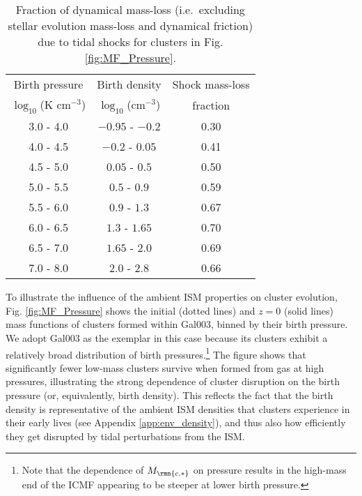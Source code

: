 \documentclass[fleqn,usenatbib]{mnras}
\newcommand{\Mcstar}{M_\rmn{c,\ast}}
\begin{document}
\begin{table}
\caption{Fraction of dynamical mass-loss (i.e.~excluding stellar evolution mass-loss and dynamical friction) due to tidal shocks for clusters in Fig. \ref{fig:MF_Pressure}.}
\label{tab:P-disruption}
\centering
\begin{tabular} {@{}ccc@{}}
  \hline
  Birth pressure           & Birth density & Shock mass-loss \\
  $\log_{10}$(K cm$^{-3}$) & $\log_{10}$(cm$^{-3}$) & fraction \\
  \hline
  3.0 - 4.0  &  $-0.95$ - $-0.2 $  &  0.30 \\
  4.0 - 4.5  &  $-0.2 $ - $ 0.05$  &  0.41 \\
  4.5 - 5.0  &  $ 0.05$ - $ 0.5 $  &  0.50 \\
  5.0 - 5.5  &  $ 0.5 $ - $ 0.9 $  &  0.59 \\
  5.5 - 6.0  &  $ 0.9 $ - $ 1.3 $  &  0.67 \\
  6.0 - 6.5  &  $ 1.3 $ - $ 1.65$  &  0.70 \\
  6.5 - 7.0  &  $ 1.65$ - $ 2.0 $  &  0.69 \\
  7.0 - 8.0  &  $ 2.0 $ - $ 2.8 $  &  0.66 \\
  \hline
\end{tabular}
\end{table}

To illustrate the influence of the ambient ISM properties on cluster evolution, Fig. \ref{fig:MF_Pressure} shows the initial (dotted lines) and $z=0$ (solid lines) mass functions of clusters formed within Gal003, binned by their birth pressure. We adopt Gal003 as the exemplar in this case because its clusters exhibit a relatively broad distribution of birth pressures.\footnote{Note that the dependence of $\Mcstar$ on pressure results in the high-mass end of the ICMF appearing to be steeper at lower birth pressure.} The figure shows that significantly fewer low-mass clusters survive when formed from gas at high pressures, illustrating the strong dependence of cluster disruption on the birth pressure (or, equivalently, birth density). This reflects the fact that the birth density is representative of the ambient ISM densities that clusters experience in their early lives (see Appendix \ref{app:env_density}), and thus also how efficiently they get disrupted by tidal perturbations from the ISM.
\end{document}
